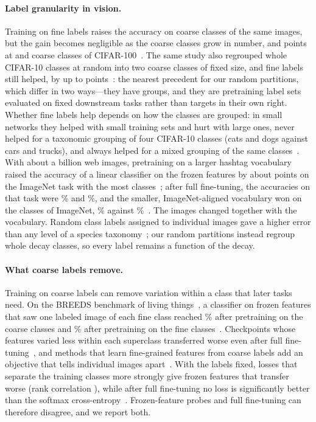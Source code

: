 \documentclass[11pt]{article}
\newcommand{\Kcoarse}{\VocabSizeRonesixQone}
\begin{document}
\paragraph{Label granularity in vision.} Training on fine labels raises the accuracy on coarse
classes of the same images, but the gain becomes negligible as the coarse classes grow in number,
\LitChenGainFifteen{} and \LitChenGainTwenty{} points at \LitChenCoarseFifteen{} and
\LitChenCoarseTwenty{} coarse classes of CIFAR-100~\cite[Table~VIII]{chen}. The same study also
regrouped whole CIFAR-10 classes at random into two coarse classes of fixed size, and fine labels
still helped, by up to \LitChenRandomMaxGain{} points~\cite[Table~VI]{chen}: the nearest precedent
for our random partitions, which differ in two ways---they have \Kcoarse{} groups, and they are
pretraining label sets evaluated on fixed downstream tasks rather than targets in their own right.
Whether fine labels help depends on how the classes are grouped: in small networks they helped with
small training sets and hurt with large ones, never helped for a taxonomic grouping of four CIFAR-10
classes (cats and dogs against cars and trucks), and always helped for a mixed grouping of the same
classes~\cite[Figs.~2--3]{pirovano}. With about a billion web images, pretraining on a larger
hashtag vocabulary raised the accuracy of a linear classifier on the frozen features by about
\LitMahajanLinearGapPercent{} points on the ImageNet task with the most
classes~\cite[Sec.~3.1.2]{mahajan}; after full fine-tuning, the accuracies on that task were
\LitMahajanFtNineKLarge\% and \LitMahajanFtNineKSmall\%, and the smaller, ImageNet-aligned
vocabulary won on the \LitHuhFineClasses{} classes of ImageNet, \LitMahajanFtOneKSmall\% against
\LitMahajanFtOneKLarge\%~\cite[Fig.~1]{mahajan}. The images changed together with the vocabulary.
Random class labels assigned to individual images gave a higher error than any level of a species
taxonomy~\cite[Table~1]{hong}; our random partitions instead regroup whole decay classes, so every
label remains a function of the decay.

\paragraph{What coarse labels remove.} Training on coarse labels can remove variation within a
class that later tasks need. On the BREEDS benchmark of living things~\cite{breeds}, a classifier
on frozen features that saw one labeled image of each fine class reached \LitBukchinCoarse\% after
pretraining on the coarse classes and \LitBukchinFine\% after pretraining on the fine
classes~\cite[Table~2]{bukchin}. Checkpoints whose features varied less within each superclass
transferred worse even after full fine-tuning~\cite[Sec.~4]{hui}, and methods that learn
fine-grained features from coarse labels add an objective that tells individual images
apart~\cite{xucoarse,grafit,bukchin}. With the labels fixed, losses that separate the training
classes more strongly give frozen features that transfer worse (rank correlation
\LitKornblithRho), while after full fine-tuning no loss is significantly better than the softmax
cross-entropy~\cite{kornblith}. Frozen-feature probes and full fine-tuning can therefore disagree,
and we report both.
\end{document}
